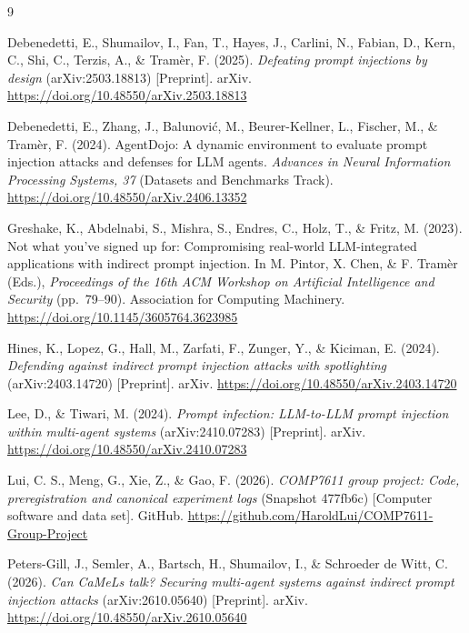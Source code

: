 \documentclass[11pt,a4paper]{article}
\begin{document}
\begin{thebibliography}{9}
\small

Debenedetti, E., Shumailov, I., Fan, T., Hayes, J., Carlini, N., Fabian, D., Kern, C., Shi, C., Terzis, A., \& Tram\`er, F. (2025). \emph{Defeating prompt injections by design} (arXiv:2503.18813) [Preprint]. arXiv. \url{https://doi.org/10.48550/arXiv.2503.18813}

Debenedetti, E., Zhang, J., Balunovi\'{c}, M., Beurer-Kellner, L., Fischer, M., \& Tram\`er, F. (2024). AgentDojo: A dynamic environment to evaluate prompt injection attacks and defenses for LLM agents. \emph{Advances in Neural Information Processing Systems, 37} (Datasets and Benchmarks Track). \url{https://doi.org/10.48550/arXiv.2406.13352}

Greshake, K., Abdelnabi, S., Mishra, S., Endres, C., Holz, T., \& Fritz, M. (2023). Not what you've signed up for: Compromising real-world LLM-integrated applications with indirect prompt injection. In M. Pintor, X. Chen, \& F. Tram\`er (Eds.), \emph{Proceedings of the 16th ACM Workshop on Artificial Intelligence and Security} (pp.~79--90). Association for Computing Machinery. \url{https://doi.org/10.1145/3605764.3623985}

Hines, K., Lopez, G., Hall, M., Zarfati, F., Zunger, Y., \& Kiciman, E. (2024). \emph{Defending against indirect prompt injection attacks with spotlighting} (arXiv:2403.14720) [Preprint]. arXiv. \url{https://doi.org/10.48550/arXiv.2403.14720}

Lee, D., \& Tiwari, M. (2024). \emph{Prompt infection: LLM-to-LLM prompt injection within multi-agent systems} (arXiv:2410.07283) [Preprint]. arXiv. \url{https://doi.org/10.48550/arXiv.2410.07283}

Lui, C. S., Meng, G., Xie, Z., \& Gao, F. (2026). \emph{COMP7611 group project: Code, preregistration and canonical experiment logs} (Snapshot 477fb6c) [Computer software and data set]. GitHub. \url{https://github.com/HaroldLui/COMP7611-Group-Project}

Peters-Gill, J., Semler, A., Bartsch, H., Shumailov, I., \& Schroeder de Witt, C. (2026). \emph{Can CaMeLs talk? Securing multi-agent systems against indirect prompt injection attacks} (arXiv:2610.05640) [Preprint]. arXiv. \url{https://doi.org/10.48550/arXiv.2610.05640}


\end{thebibliography}
\end{document}

